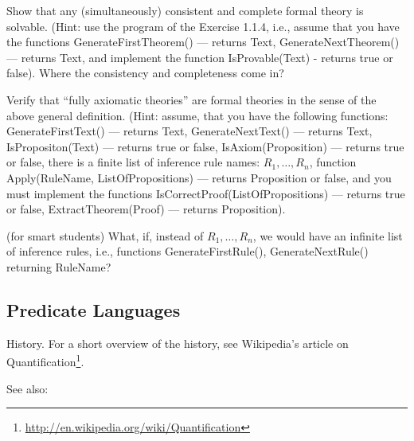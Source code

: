 \begin{exercise}
Show that any (simultaneously) consistent and complete formal theory is solvable. (Hint: use the program of the Exercise 1.1.4, i.e., assume that you have the functions GenerateFirstTheorem() --- returns Text, GenerateNextTheorem() --- returns Text, and implement the function IsProvable(Text) - returns true or false). Where the consistency and completeness come in?
\end{exercise}

\begin{exercise}
\begin{inparaenum}[(a)]
    \item Verify that ``fully axiomatic theories'' are formal theories in the sense of the above general definition.
    (Hint: assume, that you have the following functions: GenerateFirstText() --- returns Text, GenerateNextText() --- returns Text, IsPropositon(Text) --- returns true or false, IsAxiom(Proposition) --- returns true or false, there is a finite list of inference rule names: \({R_1, \ldots, R_n}\), function Apply(RuleName, ListOfPropositions) --- returns Proposition or false, and you must implement the functions IsCorrectProof(ListOfPropositions) --- returns true or false, ExtractTheorem(Proof) --- returns Proposition).
    \item (for smart students) What, if, instead of \({R_1, \ldots, R_n}\), we would have an infinite list of inference rules, i.e., functions GenerateFirstRule(), GenerateNextRule() returning RuleName?
\end{inparaenum}
\end{exercise}

\subsection{Predicate Languages}

History.
For a short overview of the history, see Wikipedia's article on Quantification\footnote{\url{http://en.wikipedia.org/wiki/Quantification}}.

See also:

